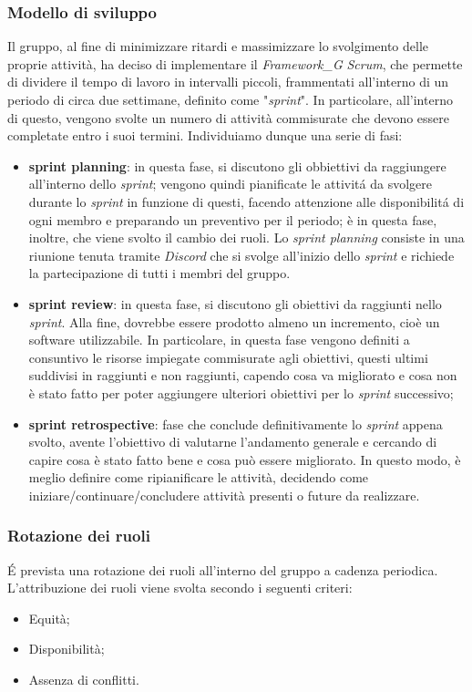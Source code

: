 \documentclass[12pt, oneside]{article}
\begin{document}
\subsubsection{Modello di sviluppo}
Il gruppo, al fine di minimizzare ritardi e massimizzare lo svolgimento delle proprie attività, ha deciso
di implementare il \textit{Framework_G} \textit{Scrum}, che permette di dividere il tempo di lavoro in intervalli piccoli, frammentati all’interno di un periodo di circa due settimane, definito come "\textit{sprint}". In particolare, all’interno di
questo, vengono svolte un numero di attività commisurate che devono essere completate entro i suoi termini. Individuiamo dunque una serie di fasi:
\begin{itemize}
    \item \textbf{sprint planning}: in questa fase, si discutono gli obbiettivi da raggiungere all'interno dello \textit{sprint}; vengono quindi pianificate le attivitá da svolgere durante lo \textit{sprint} in funzione di questi, facendo attenzione alle disponibilitá di ogni membro e preparando un preventivo per il periodo; è in questa fase, inoltre, che viene svolto il cambio dei ruoli.
    Lo \textit{sprint planning} consiste in una riunione tenuta tramite \textit{Discord} che si svolge all'inizio dello \textit{sprint} e richiede la partecipazione di tutti i membri del gruppo.
    
    \item \textbf{sprint review}: in questa fase, si discutono gli obiettivi da raggiunti nello \textit{sprint}. Alla fine, dovrebbe essere prodotto almeno un incremento, cioè un software utilizzabile. In particolare, in questa fase vengono definiti a consuntivo le risorse impiegate commisurate agli obiettivi, questi ultimi suddivisi in raggiunti e non raggiunti, capendo cosa va migliorato e cosa non è stato fatto per poter aggiungere ulteriori obiettivi per lo \textit{sprint} successivo;
    
    \item \textbf{sprint retrospective}: fase che conclude definitivamente lo \textit{sprint} appena svolto, avente l'obiettivo di valutarne l'andamento generale e cercando di capire cosa è stato fatto bene e cosa può essere migliorato. In questo modo, è meglio definire come ripianificare le attività, decidendo come iniziare/continuare/concludere attività presenti o future da realizzare.
\end{itemize}

\subsubsection{Rotazione dei ruoli}
\'E prevista una rotazione dei ruoli all'interno del gruppo a cadenza periodica.
L’attribuzione dei ruoli viene svolta secondo i seguenti criteri:
\begin{itemize}
    \item Equità;
    \item Disponibilità;
    \item Assenza di conflitti.
\end{itemize}
\end{document}
